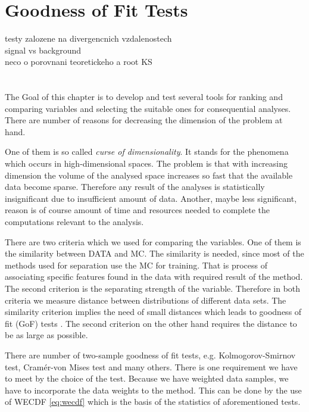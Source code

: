 \chapter{Goodness of Fit Tests}
\label{ch:GoF}


testy zalozene na divergencnich vzdalenostech \\
signal vs background \\
neco o porovnani teoretickeho a root KS \\
\\
\\


\noindent The Goal of this chapter is to develop and test several tools for ranking and comparing variables and selecting the suitable ones for consequential analyses. There are number of reasons for decreasing the dimension of the problem at hand. 

One of them is so called {\em curse of dimensionality}. It stands for the phenomena which occurs in high-dimensional spaces. The problem is that with increasing dimension the volume of the analysed space increases so fast that the available data become sparse. Therefore any result of the analyses is statistically insignificant due to insufficient amount of data. Another, maybe less significant, reason is of course amount of time and resources needed to complete the computations relevant to the analysis. 

There are two criteria which we used for comparing the variables. One of them is the similarity between DATA and MC. The similarity is needed, since most of the methods used for separation use the MC for training. That is process of associating specific features found in the data with required result of the method. The second criterion is the separating strength of the variable. Therefore in both criteria we measure distance between distributions of different data sets. The similarity criterion implies the need of small distances which leads to goodness of fit (GoF)  tests . The second criterion on the other hand requires the distance to be as large as possible. 

There are number of two-sample goodness of fit  tests, e.g. Kolmogorov-Smirnov test, Cram\'{e}r-von Mises test and many others. There is one requirement we have to meet by the choice of the test. Because we have weighted data samples, we have to incorporate the data weights to the method. This can be done by the use of WECDF  \eqref{eq:wecdf} which is the basis of the statistics of aforementioned tests. 

